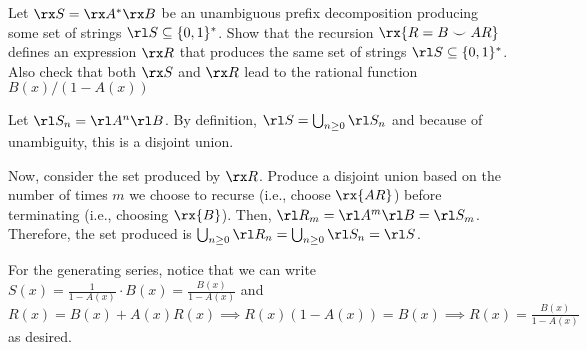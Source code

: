 \begin{xca}
  Let $\rx S = \rx A^* \rx B$ be an unambiguous prefix decomposition
  producing some set of strings $\rl S \subseteq \{0,1\}^*$.
  Show that the recursion $\rx{R = B \smile A R}$ defines an expression $\rx R$
  that produces the same set of strings $\rl S \subseteq \{0,1\}^*$.
  Also check that both $\rx S$ and $\rx R$ lead to the rational function $B(x)/(1 - A(x))$
\end{xca}
\begin{prf}
  Let $\rl S_n = \rl A^n \rl B$.
  By definition, $\rl S = \bigcup_{n\geq 0} \rl S_n$
  and because of unambiguity, this is a disjoint union.

  Now, consider the set produced by $\rx R$.
  Produce a disjoint union based on the number of times $m$ we choose to recurse
  (i.e., choose $\rx{AR}$) before terminating (i.e., choosing $\rx{B}$).
  Then, $\rl R_m = \rl A^m \rl B = \rl S_m$.
  Therefore, the set produced is $\bigcup_{n\geq 0} \rl R_n = \bigcup_{n\geq 0} \rl S_n = \rl S$.

  For the generating series, notice that we can write $S(x) = \frac{1}{1-A(x)}\cdot B(x)
    = \frac{B(x)}{1-A(x)}$ and $R(x) = B(x) + A(x)R(x)
    \implies R(x)(1-A(x)) = B(x) \implies R(x) = \frac{B(x)}{1-A(x)}$
  as desired.
\end{prf}

